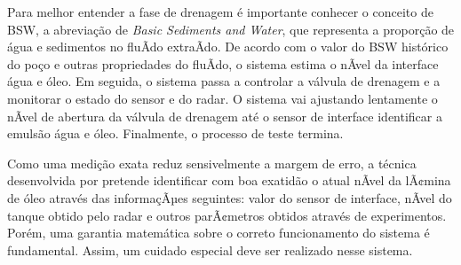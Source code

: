 \documentclass[11pt]{article} %
\begin{document}


Para melhor entender a fase de drenagem é importante conhecer o conceito de BSW, a abreviação de
\textit{Basic Sediments and Water}, que representa a proporção de água e sedimentos no fluÃ­do extraÃ­do.
De acordo com o valor do BSW histórico do poço e outras propriedades do fluÃ­do, o sistema estima o nÃ­vel
da interface água e óleo.
Em seguida, o sistema passa a controlar a válvula de drenagem e a monitorar o estado do sensor e do radar.
O sistema vai ajustando lentamente o nÃ­vel de abertura da válvula de drenagem até o sensor de interface
identificar a emulsão água e óleo. Finalmente, o processo de teste termina.

Como uma medição exata reduz sensivelmente a margem de erro,
a técnica desenvolvida por \cite{LAUT_SERGIO} pretende identificar com boa
exatidão o atual nÃ­vel da lÃ¢mina de óleo através das informaçÃµes seguintes: valor
do sensor de interface,  nÃ­vel do tanque obtido pelo radar e outros parÃ¢metros
obtidos através de experimentos. Porém, uma garantia matemática sobre o correto
funcionamento do sistema é fundamental. Assim, um cuidado especial deve ser
realizado nesse sistema.
\end{document}
